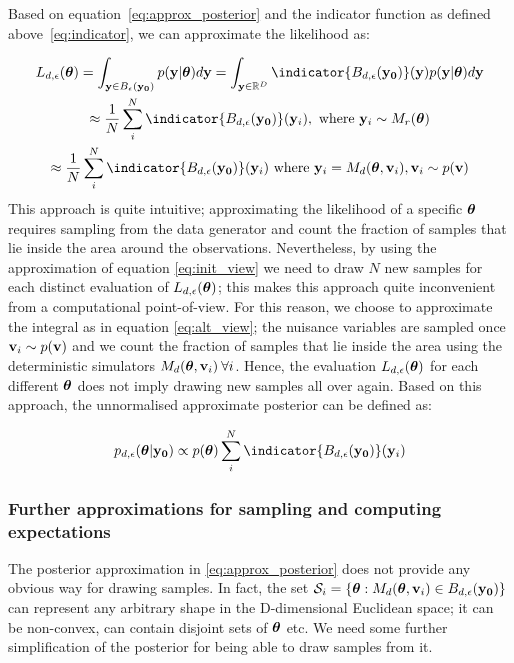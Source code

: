 \noindent
Based on equation~\eqref{eq:approx_posterior} and the indicator
function as defined above~\eqref{eq:indicator}, we can approximate the
likelihood as:

\begin{gather} \label{eq:approx_likelihood}
  L_{d, \epsilon}(\thetab) =
  \int_{\yb \in B_\epsilon(\data)}p(\yb|\thetab)d\yb =
  \int_{\yb \in \R^D} \indicator{\region(\data)}(\yb)p(\yb|\thetab)d\yb\\
  \approx \frac{1}{N} \sum_i^N \indicator{\region(\data)}(\yb_i),\text{ where }
  \yb_i \sim M_r(\thetab) \label{eq:init_view}\\
  \approx \frac{1}{N} \sum_i^N \indicator{\region (\data)} (\yb_i)
  \text{ where } \yb_i = M_d(\thetab, \vb_i), \vb_i \sim p(\vb) \label{eq:alt_view}
\end{gather}
%
This approach is quite intuitive; approximating the likelihood of a
specific $\boldsymbol{\theta}$ requires sampling from the data generator and count
the fraction of samples that lie inside the area around the
observations. Nevertheless, by using the approximation of equation
\eqref{eq:init_view} we need to draw $N$ new samples for each distinct
evaluation of $L_{d,\epsilon}(\boldsymbol{\theta})$; this makes this approach
quite inconvenient from a computational point-of-view. For this
reason, we choose to approximate the integral as in equation
\eqref{eq:alt_view}; the nuisance variables are sampled once
$\mathbf{v}_i \sim p(\mathbf{v})$ and we count the fraction of samples that lie
inside the area using the deterministic simulators
$M_d(\boldsymbol{\theta}, \mathbf{v}_i) \: \forall i$. Hence, the evaluation
$L_{d,\epsilon}(\boldsymbol{\theta})$ for each different $\boldsymbol{\theta}$ does not imply
drawing new samples all over again. Based on this approach, the
unnormalised approximate posterior can be defined as:

\begin{equation} \label{eq:aprox_posterior}
  p_{d,\epsilon}(\thetab|\data)
  \propto p(\thetab) \sum_i^N \indicator{ \region(\data)} (\yb_i)
\end{equation}

\subsubsection*{Further approximations for sampling and computing expectations}

The posterior approximation in \eqref{eq:approx_posterior} does not
provide any obvious way for drawing samples. In fact, the set
$\mathcal{S}_i = \{ \boldsymbol{\theta}: M_d(\boldsymbol{\theta}, \mathbf{v}_i) \in B_{d,\epsilon}(\mathbf{y_0}) \}$ can
represent any arbitrary shape in the D-dimensional Euclidean space; it
can be non-convex, can contain disjoint sets of $\boldsymbol{\theta}$ etc. We need
some further simplification of the posterior for being able to draw
samples from it.

